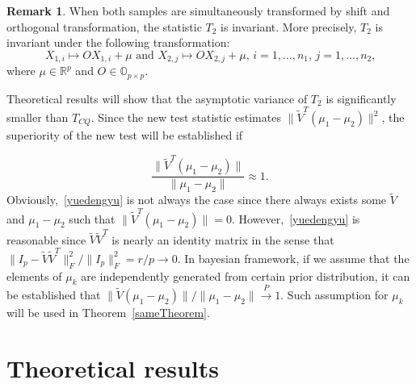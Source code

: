 \documentclass[review]{elsarticle}
\theoremstyle{plain}
\theoremstyle{definition}
\newtheorem{remark}{\quad\quad Remark}
\theoremstyle{remark}
\begin{document}
\begin{remark} When both samples are simultaneously transformed by shift and orthogonal transformation, the statistic $T_2$ is invariant.
    More precisely, $T_2$ is invariant under the following transformation: 
    \begin{equation*}
        \textrm{$X_{1,i}\mapsto OX_{1,i}+\mu$ and $X_{2,j}\mapsto OX_{2,j}+\mu$, $i=1,\ldots,n_1$, $j=1,\ldots,n_2$,}
    \end{equation*}
    where $\mu\in\mathbb{R}^p$ and $O\in\mathbb{O}_{p\times p}$.
\end{remark}



    Theoretical results will show that the asymptotic variance of $T_2$ is significantly smaller than $T_{CQ}$. 
    Since the new test statistic estimates $\|\tilde{V}^T(\mu_1-\mu_2)\|^2$,
 the superiority of the new test will be established if 
    
\begin{equation}\label{yuedengyu}
    \frac{\|\tilde{V}^T(\mu_1-\mu_2)\|}{\|\mu_1-\mu_2\|}\approx 1.
\end{equation}
Obviously,~\eqref{yuedengyu}
is not always the case since there always exists some
$\tilde{V}$ and $\mu_1-\mu_2$ such that $\|\tilde{V}^T(\mu_1-\mu_2)\|=0$.
However,~\eqref{yuedengyu} is reasonable since $\tilde{V}\tilde{V}^T$ is nearly an identity matrix in the sense that
    ${\|I_p-\tilde{V}\tilde{V}^T\|_F^2}/{\|I_p\|_F^2}=r/p\to 0$. 
In bayesian framework, if we assume that the elements of $\mu_k$ are independently generated from certain prior distribution, it can be established that 
    ${\|\tilde{V}(\mu_1-\mu_2)\|}/{\|\mu_1-\mu_2\|}\xrightarrow{P}1$.
Such assumption for $\mu_k$ will be used in Theorem~\ref{sameTheorem}.






\section{Theoretical results}
\end{document}
